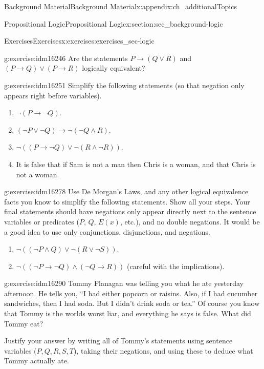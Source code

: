 \documentclass[oneside,10pt,]{book}
\numberwithin{equation}{chapter}
\def\imp{\rightarrow}
\begin{document}
\begin{appendixptx}{Background Material}{}{Background Material}{}{}{x:appendix:ch_additionalTopics}
\begin{sectionptx}{Propositional Logic}{}{Propositional Logic}{}{}{x:section:sec_background-logic}
\begin{exercises-subsection}{Exercises}{}{Exercises}{}{}{x:exercises:exercises_sec-logic}
\begin{divisionexercise}{6}{}{}{g:exercise:idm16246}%
Are the statements \(P \imp (Q\vee R)\) and \((P \imp Q) \vee (P \imp R)\) logically equivalent?%
\end{divisionexercise}%
\begin{divisionexercise}{7}{}{}{g:exercise:idm16251}%
Simplify the following statements (so that negation only appears right before variables).%
\par
%
\begin{enumerate}[label=(\alph*)]
\item{}\(\neg(P \imp \neg Q)\).%
\item{}\((\neg P \vee \neg Q) \imp \neg (\neg Q \wedge R)\).%
\item{}\(\neg((P \imp \neg Q) \vee \neg (R \wedge \neg R))\).%
\item{}It is false that if Sam is not a man then Chris is a woman, and that Chris is not a woman.%
\end{enumerate}
%
\end{divisionexercise}%
\begin{divisionexercise}{8}{}{}{g:exercise:idm16278}%
Use De Morgan's Laws, and any other logical equivalence facts you know to simplify the following statements. Show all your steps. Your final statements should have negations only appear directly next to the sentence variables or predicates (\(P\), \(Q\), \(E(x)\), etc.), and no double negations. It would be a good idea to use only conjunctions, disjunctions, and negations.%
\par
%
\begin{enumerate}[label=(\alph*)]
\item{}\(\neg((\neg P \wedge Q) \vee \neg(R \vee \neg S))\). %
\item{}\(\neg((\neg P \imp \neg Q) \wedge (\neg Q \imp R))\) (careful with the implications). %
\end{enumerate}
%
\end{divisionexercise}%
\begin{divisionexercise}{9}{}{}{g:exercise:idm16290}%
Tommy Flanagan was telling you what he ate yesterday afternoon. He tells you, ``I had either popcorn or raisins. Also, if I had cucumber sandwiches, then I had soda. But I didn't drink soda or tea.'' Of course you know that Tommy is the worlds worst liar, and everything he says is false. What did Tommy eat?%
\par
Justify your answer by writing all of Tommy's statements using sentence variables (\(P, Q, R, S, T\)), taking their negations, and using these to deduce what Tommy actually ate.%

\end{divisionexercise}
\end{exercises-subsection}
\end{sectionptx}
\end{appendixptx}
\end{document}
